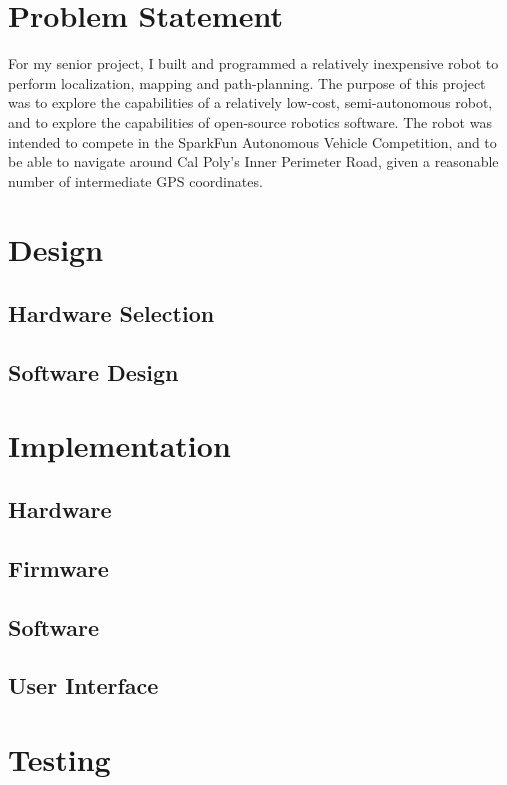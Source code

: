 \documentclass[a4paper,12pt]{article}
\begin{document}
\section{Problem Statement}
For my senior project, I built and programmed a relatively inexpensive robot to perform localization, mapping and path-planning. The purpose of this project was to explore the capabilities of a relatively low-cost, semi-autonomous robot, and to explore the capabilities of open-source robotics software. The robot was intended to compete in the SparkFun Autonomous Vehicle Competition\cite{avc}, and to be able to navigate around Cal Poly's Inner Perimeter Road, given a reasonable number of intermediate GPS coordinates.

\section{Design}
\subsection{Hardware Selection}


\subsection{Software Design}


\section{Implementation}
\subsection{Hardware}


\subsection{Firmware}


\subsection{Software}


\subsection{User Interface}


\section{Testing}
\end{document}
